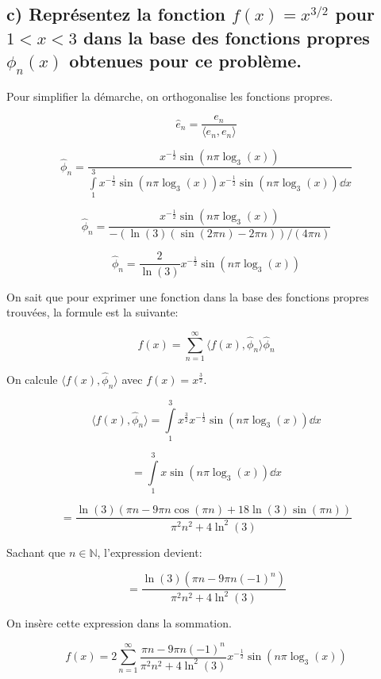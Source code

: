 \documentclass{article}
\begin{document}
\subsection*{c) Représentez la fonction $f(x) = x^{3/2}$ pour $1 < x < 3$ dans la base des fonctions propres $\phi_n(x)$ obtenues pour ce problème.}

Pour simplifier la démarche, on orthogonalise les fonctions propres.

$$\hat{e}_n = \frac{e_n}{\langle e_n, e_n\rangle}$$

$$\hat{\phi}_n = \frac{x^{-\frac{1}{2}}\sin( n\pi\log_3\!(x))}{\int\limits_{1}^{3}x^{-\frac{1}{2}}\sin( n\pi\log_3\!(x))x^{-\frac{1}{2}}\sin( n\pi\log_3\!(x))\dd x }$$

$$\hat{\phi}_n = \frac{x^{-\frac{1}{2}}\sin( n\pi\log_3\!(x))}{ -(\ln(3) (\sin(2 \pi n) - 2 \pi n))/(4 \pi n)}$$

$$\hat{\phi}_n = \frac{2}{ \ln(3)}x^{-\frac{1}{2}}\sin( n\pi\log_3\!(x))$$

On sait que pour exprimer une fonction dans la base des fonctions propres trouvées, la formule est la suivante:

$$f(x) = \sum_{n=1}^{\infty}\langle f(x), \hat{\phi}_n \rangle \hat{\phi}_n$$

On calcule $\langle f(x), \hat{\phi}_n \rangle$ avec $f(x) = x^{\frac{3}{2}}$.

$$\langle f(x), \hat{\phi}_n \rangle = \int\limits_{1}^{3}x^{\frac{3}{2}}x^{-\frac{1}{2}}\sin(n\pi\log_3\!(x))\dd x$$

$$ = \int\limits_{1}^{3}x\sin(n\pi\log_3\!(x)) \dd x $$

$$ = \frac{\ln(3) (\pi n - 9 \pi n \cos(\pi n) + 18 \ln(3) \sin(\pi n))}{\pi^2 n^2 + 4 \ln^2(3)}$$

Sachant que $n \in \mathbb{N}$, l'expression devient:

$$ = \frac{\ln(3) (\pi n - 9 \pi n(-1)^{n})}{\pi^2 n^2 + 4 \ln^2(3)}$$

On insère cette expression dans la sommation.

$$f(x) = 2\sum_{n=1}^{\infty}\frac{ \pi n - 9 \pi n(-1)^{n}}{\pi^2 n^2 + 4 \ln^2(3)}x^{-\frac{1}{2}}\sin( n\pi\log_3\!(x))$$
\end{document}
